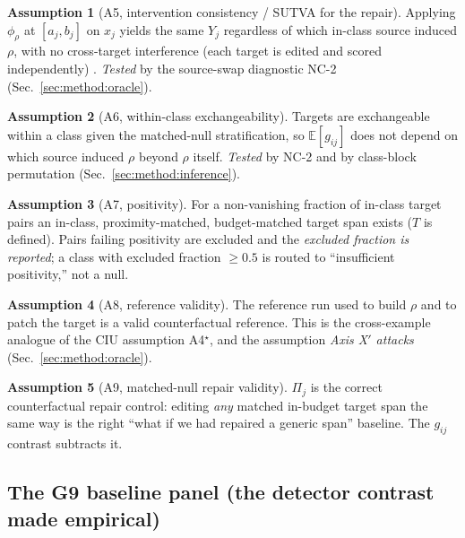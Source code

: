 \documentclass[11pt]{article}
\theoremstyle{plain}
\theoremstyle{definition}
\newtheorem{assumption}{Assumption}
\newcommand{\Pij}{\Pi_j}
\newcommand{\Eop}{\mathbb{E}}
\newcommand{\policy}{\rho}
\begin{document}
\begin{assumption}[A5, intervention consistency / SUTVA for the repair]\label{ass:a5}
Applying $\phi_\policy$ at $[a_j,b_j]$ on $x_j$ yields the same $Y_j$ regardless of
which in-class source induced $\policy$, with no cross-target interference (each
target is edited and scored independently)
\cite{rubin1980randomization,imbens2015causal}. \emph{Tested} by the source-swap
diagnostic NC-2 (Sec.~\ref{sec:method:oracle}).
\end{assumption}
\begin{assumption}[A6, within-class exchangeability]\label{ass:a6}
Targets are exchangeable within a class given the matched-null stratification, so
$\Eop[g_{ij}]$ does not depend on which source induced $\policy$ beyond $\policy$
itself. \emph{Tested} by NC-2 and by class-block permutation
(Sec.~\ref{sec:method:inference}).
\end{assumption}
\begin{assumption}[A7, positivity]\label{ass:a7}
For a non-vanishing fraction of in-class target pairs an in-class,
proximity-matched, budget-matched target span exists ($T$ is defined). Pairs failing
positivity are excluded and the \emph{excluded fraction is reported}; a class with
excluded fraction $\ge0.5$ is routed to ``insufficient positivity,'' not a null.
\end{assumption}
\begin{assumption}[A8, reference validity]\label{ass:a8}
The reference run used to build $\policy$ and to patch the target is a valid
counterfactual reference. This is the cross-example analogue of the CIU assumption
A4$^\star$, and the assumption \emph{Axis X$'$ attacks} (Sec.~\ref{sec:method:oracle}).
\end{assumption}
\begin{assumption}[A9, matched-null repair validity]\label{ass:a9}
$\Pij$ is the correct counterfactual repair control: editing \emph{any} matched
in-budget target span the same way is the right ``what if we had repaired a generic
span'' baseline. The $g_{ij}$ contrast subtracts it.
\end{assumption}

\subsection{The G9 baseline panel (the detector contrast made empirical)}\label{sec:method:baselines}
\end{document}
